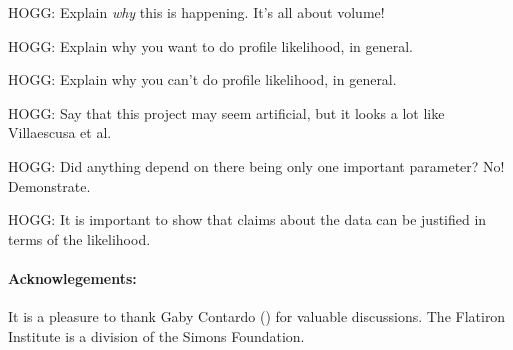 \documentclass[10pt]{article}
\begin{document}
HOGG: Explain \emph{why} this is happening. It's all about volume!

HOGG: Explain why you want to do profile likelihood, in general.

HOGG: Explain why you can't do profile likelihood, in general.

HOGG: Say that this project may seem artificial, but it looks a lot like Villaescusa et al.

HOGG: Did anything depend on there being only one important parameter? No! Demonstrate.

HOGG: It is important to show that claims about the data can be justified in terms of the likelihood.

\paragraph{Acknowlegements:}
It is a pleasure to thank
  Gaby Contardo ()
for valuable discussions.
The Flatiron Institute is a division of the Simons Foundation.

\end{document}

